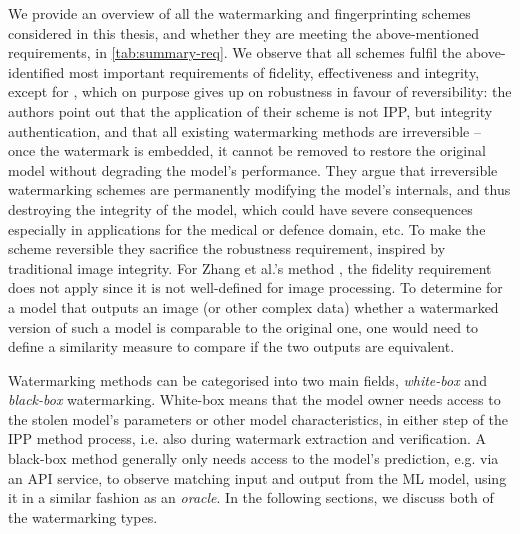 We provide an overview of all the watermarking and fingerprinting schemes considered in this thesis, and whether they are meeting the above-mentioned requirements, in \cref{tab:summary-req}.
We observe %
that all schemes fulfil the above-identified most important requirements of fidelity, effectiveness and integrity, except for \cite{guan_reversible_2020}, which on purpose gives up on robustness in favour of reversibility: the authors point out that the application of their scheme is not IPP, but integrity authentication, and that all existing watermarking methods are irreversible -- once the watermark is embedded, it cannot be removed to restore the original model without degrading the model's performance.
They argue that irreversible watermarking schemes are permanently modifying the model's internals, and thus destroying the integrity of the model, which could have severe consequences especially in applications for the medical or defence domain, etc.
To make the scheme reversible they sacrifice the robustness requirement, inspired by traditional image integrity. %
For Zhang et al.'s method \cite{zhang_model_2020}, the fidelity requirement does not apply since it is not well-defined for image processing. To determine for a model that outputs an image (or other complex data) whether a watermarked version of such a model is comparable to the original one, one would need to define a similarity measure to compare if the two outputs are equivalent.

Watermarking methods can be categorised into two main fields, \textit{white-box} and \textit{black-box} watermarking. White-box means that the model owner needs access to the stolen model's parameters or other model characteristics, in either step of the IPP method process, i.e. also during watermark extraction and verification. A black-box method generally only needs access to the model's prediction, e.g. via an API service, to observe matching input and output from the ML model, using it in a similar fashion as an \textit{oracle}. In the following sections, we discuss both of the watermarking types.



